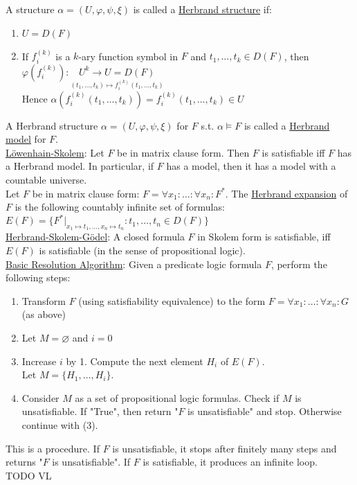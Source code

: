 \documentclass[a4paper]{article}
\newcommand{\ul}{\underline}
\let\phi\varphi
\begin{document}
A structure $\alpha=(U,\phi,\psi,\xi)$ is called a \ul{Herbrand structure} if:
\begin{enumerate}[(1)]
	\item $U=D(F)$
	\item If $f_i^{(k)}$ is a $k$-ary function symbol in $F$ and $t_1,\dots,t_k\in D(F)$, then $\phi(f_i^{(k)}):\underset{(t_1,\dots,t_k)\mapsto f_i^{(k)}(t_1,\dots,t_k)}{U^k\rightarrow U=D(F)}$\\
	Hence $\alpha(f_i^{(k)}(t_1,\dots,t_k))=f_i^{(k)}(t_1,\dots,t_k)\in U$
\end{enumerate}
A Herbrand structure $\alpha=(U,\phi,\psi,\xi)$ for $F$ s.t. $\alpha\models F$ is called a \ul{Herbrand model} for $F$.\\
\ul{Löwenhain-Skolem}: Let $F$ be in matrix clause form. Then $F$ is satisfiable iff $F$ has a Herbrand model. In particular, if $F$ has a model, then it has a model with a countable universe.\\
Let $F$ be in matrix clause form: $F=\forall x_1:\dots:\forall x_n:F^*$. The \ul{Herbrand expansion} of $F$ is the following countably infinite set of formulas: $E(F)=\{F^*\vert_{x_1\mapsto t_1,\dots,x_n\mapsto t_n}:t_1,\dots,t_n\in D(F)\}$\\
\ul{Herbrand-Skolem-Gödel}: A closed formula $F$ in Skolem form is satisfiable, iff $E(F)$ is satisfiable (in the sense of propositional logic).\\
\ul{Basic Resolution Algorithm}: Given a predicate logic formula $F$, perform the following steps:
\begin{enumerate}[(1)]
	\item Transform $F$ (using satisfiability equivalence) to the form $F=\forall x_1:\dots:\forall x_n:G$ (as above)
	\item Let $M=\varnothing$ and $i=0$
	\item Increase $i$ by 1. Compute the next element $H_i$ of $E(F)$.\\
	Let $M=\{H_1,\dots,H_i\}$.
	\item Consider $M$ as a set of propositional logic formulas. Check if $M$ is unsatisfiable. If "True", then return "$F$ is unsatisfiable" and stop. Otherwise continue with (3).
\end{enumerate}
This is a procedure. If $F$ is unsatisfiable, it stops after finitely many steps and returns "$F$ is unsatisfiable". If $F$ is satisfiable, it produces an infinite loop.\\
TODO VL\\
\end{document}
